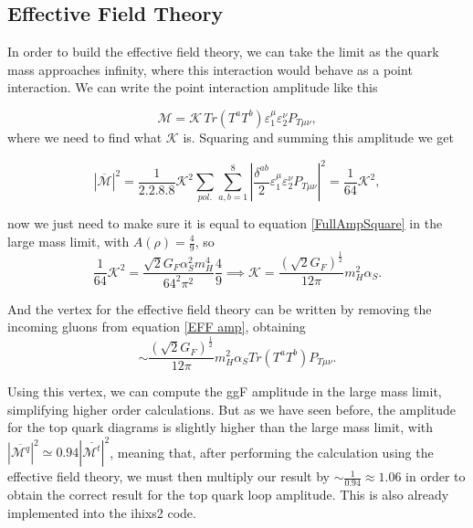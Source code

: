 \documentclass[EPJ,twocolumn]{webofc}
\begin{document}
\subsection{Effective Field Theory}
    
    In order to build the effective field theory, we can take the limit as the quark mass approaches infinity, where this interaction would behave as a point interaction. We can write the point interaction amplitude like this

    \begin{equation}
    \mathcal{M} = \mathcal{K}\,Tr\left(T^aT^b\right)\varepsilon_1^{\mu}\varepsilon_2^{\nu} P_{T\mu\nu},
    \label{EFF amp}
\end{equation}
where we need to find what $\mathcal{K}$ is. Squaring and summing this amplitude we get

\begin{equation}
    |\overline{\mathcal{M}}|^2 = \frac{1}{2.2.8.8}\mathcal{K}^2\sum_{pol.}\sum_{a,b=1}^8 \left|\frac{\delta^{ab}}{2}\varepsilon_1^{\mu}\varepsilon_2^{\nu} P_{T\mu\nu}\right|^2=\frac{1}{64}\mathcal{K}^2,
\end{equation}

now we just need to make sure it is equal to equation \ref{FullAmpSquare} in the large mass limit, with $A\left(\rho\right) = \frac{4}{9}$, so
\begin{equation}
    \frac{1}{64}\mathcal{K}^2 = \frac{\sqrt{2}G_F\alpha_S^2m_H^4}{64^2\pi^2}\frac{4}{9} \implies \mathcal{K}=\frac{ (\sqrt{2}G_F) ^{\frac{1}{2}} }{12\pi}m_H^2\alpha_S.
\end{equation}

And the vertex for the effective field theory can be written by removing the incoming gluons from equation \ref{EFF amp}, obtaining
\begin{equation}
    \sim \frac{ (\sqrt{2}G_F) ^{\frac{1}{2}} }{12\pi}m_H^2\alpha_S Tr\left(T^aT^b\right)P_{T\mu\nu}.
\end{equation}

Using this vertex, we can compute the ggF amplitude in the large mass limit, simplifying higher order calculations. But as we have seen before, the amplitude for the top quark diagrams is slightly higher than the large mass limit, with $|\overline{\mathcal{M}^{q}}|^2  \simeq 0.94|\overline{\mathcal{M}^t}|^2$, meaning that, after performing the calculation using the effective field theory, we must then multiply our result by $\sim \frac{1}{0.94} \approx 1.06$ in order to obtain the correct result for the top quark loop amplitude. This is also already implemented into the ihixs2 code.
\end{document}
